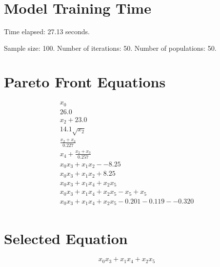 \documentclass{article}
\begin{document}
\section*{Model Training Time}
Time elapsed: 27.13 seconds.

Sample size: 100.
Number of iterations: 50.
Number of populations: 50.

\section*{Pareto Front Equations}
\begin{align*}
x_{0} \\
26.0 \\
x_{2} + 23.0 \\
14.1 \sqrt{x_{2}} \\
\frac{x_{2} + x_{3}}{0.227} \\
x_{4} + \frac{x_{2} + x_{3}}{0.257} \\
x_{0} x_{3} + x_{1} x_{2} - -8.25 \\
x_{0} x_{3} + x_{1} x_{2} + 8.25 \\
x_{0} x_{3} + x_{1} x_{4} + x_{2} x_{5} \\
x_{0} x_{3} + x_{1} x_{4} + x_{2} x_{5} - x_{5} + x_{5} \\
x_{0} x_{3} + x_{1} x_{4} + x_{2} x_{5} - 0.201 - 0.119 - -0.320 \\
\end{align*}

\section*{Selected Equation}
\[ x_{0} x_{3} + x_{1} x_{4} + x_{2} x_{5} \]
\end{document}

